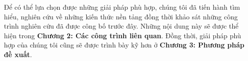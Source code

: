 Để có thể lựa chọn được những giải pháp phù hợp, chúng tôi đã tiến hành tìm hiểu, nghiên cứu về những kiến thức nền tảng đồng thời khảo sát những công trình nghiên cứu đã được công bố trước đây. Những nội dung này sẽ được thể hiện trong \textbf{Chương 2: Các công trình liên quan}. Đồng thời, giải pháp phù hợp của chúng tôi cũng sẽ được trình bày kỹ hơn ở \textbf{Chương 3: Phương pháp đề xuất}.